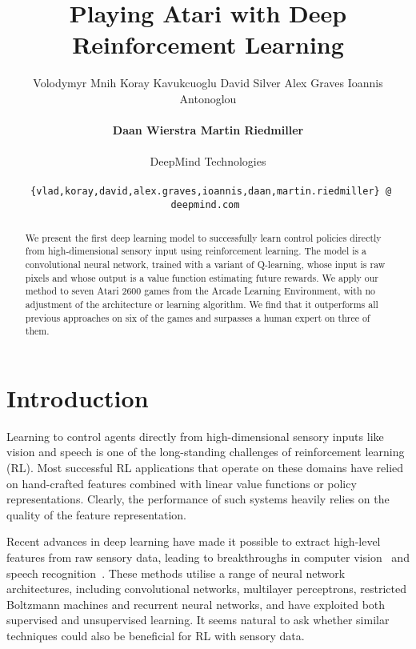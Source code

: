 \documentclass{article} \usepackage{nips13submit_e,times}
\title{Playing Atari with Deep Reinforcement Learning}
\author{
Volodymyr Mnih \hspace{0.3cm}
Koray Kavukcuoglu \hspace{0.3cm}
David Silver \hspace{0.3cm}
Alex Graves \hspace{0.3cm} 
Ioannis Antonoglou\\
\\
{\bf Daan Wierstra \hspace{0.3cm}
Martin Riedmiller}\\
\\
DeepMind Technologies\\
\\
\small{\texttt{ \{vlad,koray,david,alex.graves,ioannis,daan,martin.riedmiller\} @ deepmind.com }}
}
\begin{document}
\maketitle

\begin{abstract}


We present the first deep learning model to successfully learn control policies directly from high-dimensional sensory input using reinforcement learning. 
The model is a convolutional neural network, trained with a variant of Q-learning, whose input is raw pixels and whose output is a value function estimating future rewards.
We apply our method to seven Atari 2600 games from the Arcade Learning Environment, with no adjustment of the architecture or learning algorithm.
We find that it outperforms all previous approaches on six of the games and surpasses a human expert on three of them.
 \end{abstract}

\newcommand{\ssq}{s^{(t)}}
\newcommand{\asq}{a^{(t)}}
\newcommand{\pasq}{a^{(t-1)}}
\newcommand{\stpn}{s_{t+1}}
\newcommand{\qpi}{Q^{\pi}\left(\ssq,a_t\right)}
\newcommand{\vpi}{V^{\pi}\left(\ssq\right)}
\newcommand{\aqpi}{\hat{Q}^{\pi}}

\newcommand{\prob}[1]{\mathbb{P} \left[ #1 \right]}
\newcommand{\given}{|}
\newcommand{\expect}[1]{\mathbb{E} \left[ #1 \right]}
\newcommand{\expectx}[2]{\mathbb{E}_{#1} \left[ #2 \right]}
\newcommand{\eqdef}{\stackrel{def}{=}}


\section{Introduction}
\label{sec:introduction}










Learning to control agents directly from high-dimensional sensory inputs like vision and speech is one of the long-standing challenges of reinforcement learning (RL). 
Most successful RL applications that operate on these domains have relied on hand-crafted features combined with linear value functions or policy representations. 
Clearly, the performance of such systems heavily relies on the quality of the feature representation. 

Recent advances in deep learning have made it possible to extract high-level features from raw sensory data, leading to breakthroughs in computer vision~\cite{krizhevsky-imagenet, sermanet-cvpr-2013, mnih-thesis} and speech recognition~\cite{dahl-speech,graves-speech}.
These methods utilise a range of neural network architectures, including convolutional networks, multilayer perceptrons, restricted Boltzmann machines and recurrent neural networks, and have exploited both supervised and unsupervised learning. 
It seems natural to ask whether similar techniques could also be beneficial for RL with sensory data.
\end{document}
